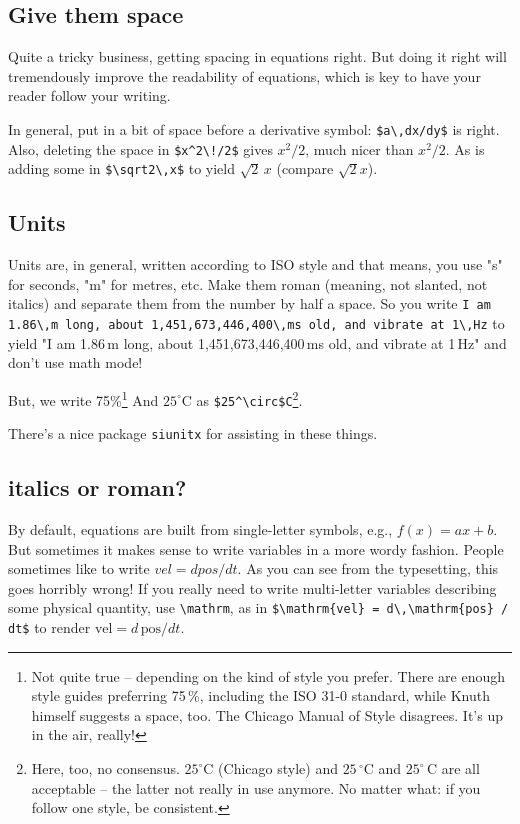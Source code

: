 \documentclass{article}
\begin{document}
\subsection{Give them space}
Quite a tricky business, getting spacing in equations right.  But doing it right will tremendously improve the readability of equations, which is key to have your reader follow your writing.

In general, put in a bit of space before a derivative symbol: \verb+$a\,dx/dy$+ is right. Also, deleting the space in \verb+$x^2\!/2$+ gives $x^2\!/2$, much nicer than $x^2/2$. As is adding some in \verb+$\sqrt2\,x$+ to yield $\sqrt2\,x$ (compare $\sqrt2x$).

\subsection{Units}
Units are, in general, written according to ISO style and that means, you use "s" for seconds, "m" for metres, etc.  Make them roman (meaning, not slanted, not italics) and separate them from the number by half a space.  So you write \texttt{I am }\verb+1.86\,m+\texttt{ long, about }\verb+1,451,673,446,400\,ms+\texttt{ old, and vibrate at }\verb+1\,Hz+ to yield "I am 1.86\,m long, about 1,451,673,446,400\,ms old, and vibrate at 1\,Hz" and don't use math mode!  

But, we write 75\%\footnote{Not quite true -- depending on the kind of style you prefer.  There are enough style guides preferring 75\,\%, including the ISO 31-0 standard, while Knuth himself suggests a space, too.  The Chicago Manual of Style disagrees.  It's up in the air, really!} And $25^\circ$C as \verb+$25^\circ$C+\footnote{Here, too, no consensus.  $25^\circ$C (Chicago style) and $25\,^\circ$C and $25^\circ\,$C are all acceptable -- the latter not really in use anymore.  No matter what: if you follow one style, be consistent.}.

There's a nice package \texttt{siunitx} for assisting in these things. 

\subsection{italics or roman?}
By default, equations are built from single-letter symbols, e.g., $f(x) = ax+b$.  But sometimes it makes sense to write variables in a more wordy fashion.  People sometimes like to write $vel = d pos / d t$.  As you can see from the typesetting, this goes horribly wrong!  If you really need to write multi-letter variables describing some physical quantity, use \verb+\mathrm+, as in \verb+$\mathrm{vel} = d\,\mathrm{pos} / dt$+ to render $\mathrm{vel} = d\, \mathrm{pos} / dt$.
\end{document}
